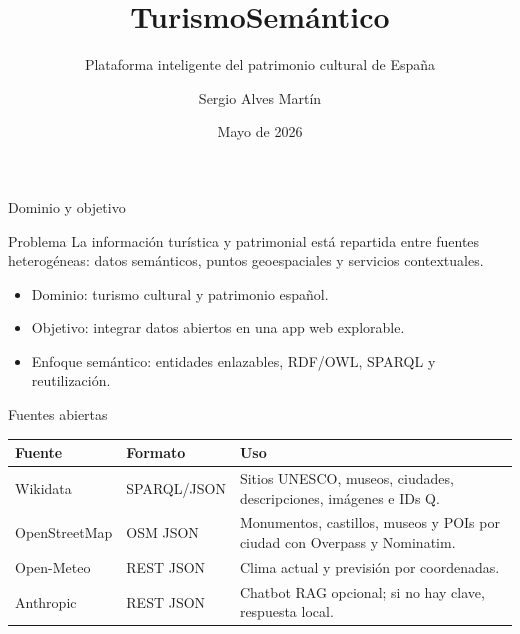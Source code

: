 \documentclass[10pt,aspectratio=169]{beamer}
\title[TurismoSemántico]{TurismoSemántico}
\subtitle{Plataforma inteligente del patrimonio cultural de España}
\author{Sergio Alves Martín}
\institute{Modelado Semántico de la Web}
\date{Mayo de 2026}
\begin{document}
\begin{frame}
  \titlepage{}
  \vspace{-0.35cm}
  \centering
  \footnotesize
  \href{https://github.com/SergioAlvesMar5/ProjectoFinal_MSW_TurismoSemantico}{}
\end{frame}

\begin{frame}{Dominio y objetivo}
  \begin{block}{Problema}
    La información turística y patrimonial está repartida entre fuentes heterogéneas:
    datos semánticos, puntos geoespaciales y servicios contextuales.
  \end{block}
  \begin{itemize}
    \item Dominio: turismo cultural y patrimonio español.
    \item Objetivo: integrar datos abiertos en una app web explorable.
    \item Enfoque semántico: entidades enlazables, RDF/OWL, SPARQL y reutilización.
  \end{itemize}
\end{frame}

\begin{frame}{Fuentes abiertas}
  \small
  \begin{tabularx}{\textwidth}{p{2.5cm}p{2.4cm}X}
    \toprule
    Fuente & Formato & Uso \\
    \midrule
    Wikidata & SPARQL/JSON & Sitios UNESCO, museos, ciudades, descripciones, imágenes e IDs Q. \\
    OpenStreetMap & OSM JSON & Monumentos, castillos, museos y POIs por ciudad con Overpass y Nominatim. \\
    Open-Meteo & REST JSON & Clima actual y previsión por coordenadas. \\
    Anthropic & REST JSON & Chatbot RAG opcional; si no hay clave, respuesta local. \\
    \bottomrule
  \end{tabularx}
\end{frame}
\end{document}
